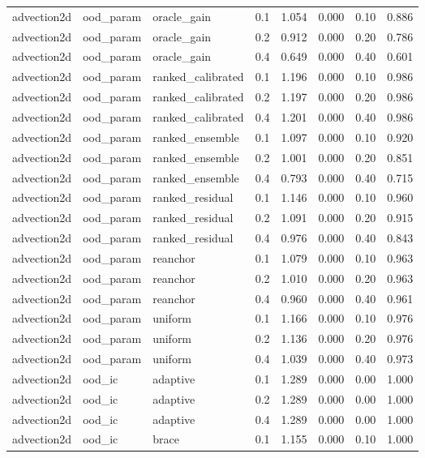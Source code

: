 \begin{longtable}{llllrrrr}
advection2d & ood\_param & oracle\_gain & 0.1 & 1.054 & 0.000 & 0.10 & 0.886 \\
advection2d & ood\_param & oracle\_gain & 0.2 & 0.912 & 0.000 & 0.20 & 0.786 \\
advection2d & ood\_param & oracle\_gain & 0.4 & 0.649 & 0.000 & 0.40 & 0.601 \\
advection2d & ood\_param & ranked\_calibrated & 0.1 & 1.196 & 0.000 & 0.10 & 0.986 \\
advection2d & ood\_param & ranked\_calibrated & 0.2 & 1.197 & 0.000 & 0.20 & 0.986 \\
advection2d & ood\_param & ranked\_calibrated & 0.4 & 1.201 & 0.000 & 0.40 & 0.986 \\
advection2d & ood\_param & ranked\_ensemble & 0.1 & 1.097 & 0.000 & 0.10 & 0.920 \\
advection2d & ood\_param & ranked\_ensemble & 0.2 & 1.001 & 0.000 & 0.20 & 0.851 \\
advection2d & ood\_param & ranked\_ensemble & 0.4 & 0.793 & 0.000 & 0.40 & 0.715 \\
advection2d & ood\_param & ranked\_residual & 0.1 & 1.146 & 0.000 & 0.10 & 0.960 \\
advection2d & ood\_param & ranked\_residual & 0.2 & 1.091 & 0.000 & 0.20 & 0.915 \\
advection2d & ood\_param & ranked\_residual & 0.4 & 0.976 & 0.000 & 0.40 & 0.843 \\
advection2d & ood\_param & reanchor & 0.1 & 1.079 & 0.000 & 0.10 & 0.963 \\
advection2d & ood\_param & reanchor & 0.2 & 1.010 & 0.000 & 0.20 & 0.963 \\
advection2d & ood\_param & reanchor & 0.4 & 0.960 & 0.000 & 0.40 & 0.961 \\
advection2d & ood\_param & uniform & 0.1 & 1.166 & 0.000 & 0.10 & 0.976 \\
advection2d & ood\_param & uniform & 0.2 & 1.136 & 0.000 & 0.20 & 0.976 \\
advection2d & ood\_param & uniform & 0.4 & 1.039 & 0.000 & 0.40 & 0.973 \\
\midrule
advection2d & ood\_ic & adaptive & 0.1 & 1.289 & 0.000 & 0.00 & 1.000 \\
advection2d & ood\_ic & adaptive & 0.2 & 1.289 & 0.000 & 0.00 & 1.000 \\
advection2d & ood\_ic & adaptive & 0.4 & 1.289 & 0.000 & 0.00 & 1.000 \\
advection2d & ood\_ic & brace & 0.1 & 1.155 & 0.000 & 0.10 & 1.000 \\

\end{longtable}
